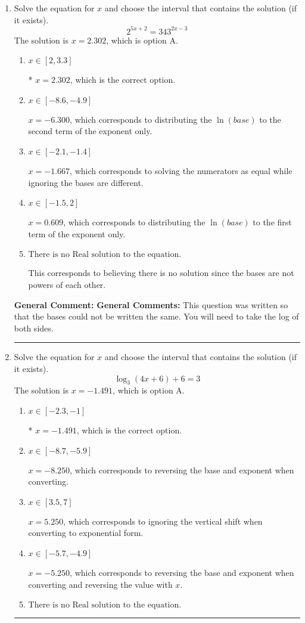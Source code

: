 \documentclass{extbook}[14pt]
\newcommand{\litem}[1]{\item #1

\rule{\textwidth}{0.4pt}}
\begin{document}
\begin{enumerate}\litem{
Solve the equation for $x$ and choose the interval that contains the solution (if it exists).
\[ 2^{5x+2} = 343^{2x-3} \]The solution is \( x = 2.302 \), which is option A.\begin{enumerate}[label=\Alph*.]
\item \( x \in [2, 3.3] \)

* $x = 2.302$, which is the correct option.
\item \( x \in [-8.6, -4.9] \)

$x = -6.300$, which corresponds to distributing the $\ln(base)$ to the second term of the exponent only.
\item \( x \in [-2.1, -1.4] \)

$x = -1.667$, which corresponds to solving the numerators as equal while ignoring the bases are different.
\item \( x \in [-1.5, 2] \)

$x = 0.609$, which corresponds to distributing the $\ln(base)$ to the first term of the exponent only.
\item \( \text{There is no Real solution to the equation.} \)

This corresponds to believing there is no solution since the bases are not powers of each other.
\end{enumerate}

\textbf{General Comment:} \textbf{General Comments:} This question was written so that the bases could not be written the same. You will need to take the log of both sides.
}
\litem{
Solve the equation for $x$ and choose the interval that contains the solution (if it exists).
\[ \log_{3}{(4x+6)}+6 = 3 \]The solution is \( x = -1.491 \), which is option A.\begin{enumerate}[label=\Alph*.]
\item \( x \in [-2.3, -1] \)

* $x = -1.491$, which is the correct option.
\item \( x \in [-8.7, -5.9] \)

$x = -8.250$, which corresponds to reversing the base and exponent when converting.
\item \( x \in [3.5, 7] \)

$x = 5.250$, which corresponds to ignoring the vertical shift when converting to exponential form.
\item \( x \in [-5.7, -4.9] \)

$x = -5.250$, which corresponds to reversing the base and exponent when converting and reversing the value with $x$.
\item \( \text{There is no Real solution to the equation.} \)


\end{enumerate}}
\end{enumerate}
\end{document}
